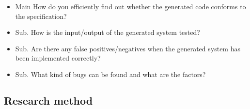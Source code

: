 \begin{itemize}
  \item Main How do you efficiently find out whether the generated code conforms to the specification?

  \item Sub. How is the input/output of the generated system tested?
  
  \item Sub. Are there any false positives/negatives when the generated system has been implemented correctly?

  \item Sub. What kind of bugs can be found and what are the factors?

\end{itemize}

\subsection{Research method}
\label{sec:research-method}

